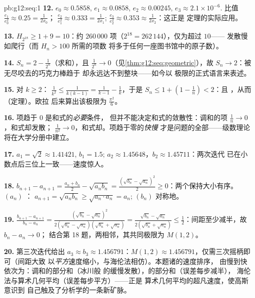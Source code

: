 \begin{solution}{pb:g12:seq:1}
\textbf{12.} $e_0 \approx 0.5858$, $e_1 \approx 0.0858$,
$e_2 \approx 0.00245$, $e_3 \approx 2.1 \times 10^{-6}$.
比值 $\frac{e_1}{e_0^2} \approx 0.25 = \frac{1}{2x_0}$；
$\frac{e_2}{e_1^2} \approx 0.333 = \frac{1}{2x_1}$;
$\frac{e_3}{e_2^2} \approx 0.353 \approx \frac{1}{2x_2}$：这正是
定理的实际应用。

\textbf{13.} $H_{2^{18}} \geq 1 + 9 = 10$：约
$260\,000$ 项（$2^{18} = 262\,144$），仅为超过 $10$——
发散慢如爬行（而 $H_n > 100$ 所需的项数
将多于任何一座图书馆中的原子数）。

\textbf{14.} $S_n = 2 - \frac{1}{2^n}$（求和），且
$\frac{1}{2^n} \to 0$（见\cref{thm:g12:seq:geometric}），故
$S_n \to 2$：被无尽咬去的巧克力棒趋于
却永远达不到整块——如今以
极限的正式语言来表述。

\textbf{15.} 对 $k \geq 2$：
$\frac{1}{k^2} \leq \frac{1}{k(k-1)} = \frac{1}{k-1} -
\frac1k$，于是
$S_n \leq 1 + \left(1 - \frac1n\right) < 2$：且
，从而（定理）。欧拉
后来算出该极限为 $\frac{\pi^2}{6}$。

\textbf{16.} 项趋于 $0$ 是和式的\emph{必要}条件，
但并不能决定和式的敛散性：调和的项
$\frac1n \to 0$，和式却发散；
$\frac{1}{n^2} \to 0$，和式却。项趋于零的\emph{快慢}
才是问题的全部——级数理论
将在大学分册中建立。

\textbf{17.} $a_1 = \sqrt2 \approx 1.41421$, $b_1 = 1.5$;
$a_2 \approx 1.45648$，$b_2 \approx 1.45711$：两次迭代
已在小数点后三位上一致——速度惊人。

\textbf{18.} $b_{n+1} - a_{n+1} = \frac{a_n + b_n}{2} -
\sqrt{a_n b_n} = \frac{(\sqrt{b_n} - \sqrt{a_n})^2}{2} \geq
0$：两个保持大小有序。$(a_n)$ ：
$a_{n+1} = \sqrt{a_n b_n} \geq \sqrt{a_n \cdot a_n} = a_n$;
$(b_n)$ 对称地。

\textbf{19.} $\frac{b_{n+1} - a_{n+1}}{b_n - a_n} =
\frac{(\sqrt{b_n} - \sqrt{a_n})^2}
{2(\sqrt{b_n} - \sqrt{a_n})(\sqrt{b_n} + \sqrt{a_n})}
= \frac{\sqrt{b_n} - \sqrt{a_n}}{2(\sqrt{b_n} + \sqrt{a_n})}
\leq \frac12$：间距至少减半，故 $b_n - a_n \to 0$；
结合第 18 题，两相邻，其共同极限为
$M(1, 2)$。

\textbf{20.} 第三次迭代给出
$a_3 \approx b_3 \approx 1.456791$：$M(1, 2) \approx
1.456791$，仅需三次摇柄即可（间距大致
以\emph{平方}速度缩小，与海伦法相仿）。本题诸的速度排序，
由慢到快依次为：调和的部分和（冰川般
的缓慢发散），的部分和（误差每步减半），
海伦法与算术几何平均（误差每步平方）——正是
算术几何平均的超凡速度，使高斯意识到
自己触及了分析学的一条新矿脉。
\end{solution}
